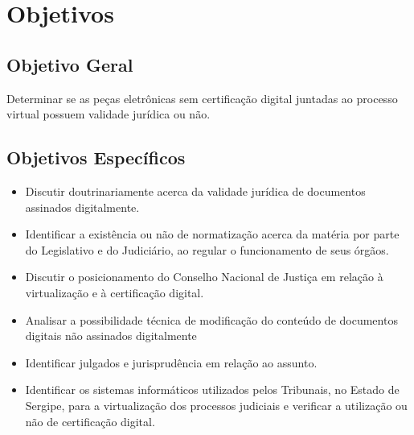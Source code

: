 \chapter{Objetivos}

\section{Objetivo Geral}

Determinar se as peças eletrônicas sem certificação digital
juntadas ao processo virtual possuem validade jurídica ou não.

\section{Objetivos Específicos}
\begin{itemize}
 \item Discutir doutrinariamente acerca da validade jurídica de
 documentos assinados digitalmente.

 \item Identificar a existência ou não de normatização acerca da
 matéria por parte do Legislativo e do Judiciário, ao regular o
 funcionamento de seus órgãos.

 \item Discutir o posicionamento do Conselho Nacional de Justiça
 em relação à virtualização e à certificação digital.

 \item Analisar a possibilidade técnica de modificação do
 conteúdo de documentos digitais não assinados digitalmente

 \item Identificar julgados e jurisprudência em relação ao assunto.

 \item Identificar os sistemas informáticos utilizados pelos
 Tribunais, no Estado de Sergipe, para a virtualização dos
 processos judiciais e verificar a utilização ou não de
 certificação digital.

\end{itemize}
